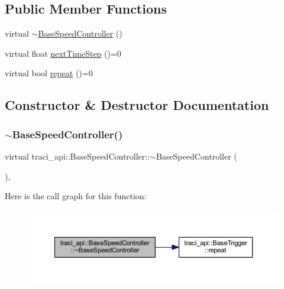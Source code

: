 \subsection*{Public Member Functions}
\begin{DoxyCompactItemize}
\item 
virtual \hyperlink{classtraci__api_1_1_base_speed_controller_a7cabfad7b110f2463c62fe9e1d882043}{$\sim$\+Base\+Speed\+Controller} ()
\item 
virtual float \hyperlink{classtraci__api_1_1_base_speed_controller_ab9658ce36f91de8a34bb710b3241c210}{next\+Time\+Step} ()=0
\item 
virtual bool \hyperlink{classtraci__api_1_1_base_speed_controller_a2d4b22945d4cb27f5fe24b05700021b6}{repeat} ()=0
\end{DoxyCompactItemize}


\subsection{Constructor \& Destructor Documentation}
\mbox{\label{classtraci__api_1_1_base_speed_controller_a7cabfad7b110f2463c62fe9e1d882043}} 
\subsubsection{\texorpdfstring{$\sim$\+Base\+Speed\+Controller()}{~BaseSpeedController()}}
{\footnotesize\ttfamily virtual traci\+\_\+api\+::\+Base\+Speed\+Controller\+::$\sim$\+Base\+Speed\+Controller (\begin{DoxyParamCaption}{ }\end{DoxyParamCaption})\hspace{0.3cm}{\ttfamily [inline]}, {\ttfamily [virtual]}}

Here is the call graph for this function\+:
\nopagebreak
\begin{figure}[H]
\begin{center}
\leavevmode
\includegraphics[width=350pt]{classtraci__api_1_1_base_speed_controller_a7cabfad7b110f2463c62fe9e1d882043_cgraph}
\end{center}
\end{figure}


